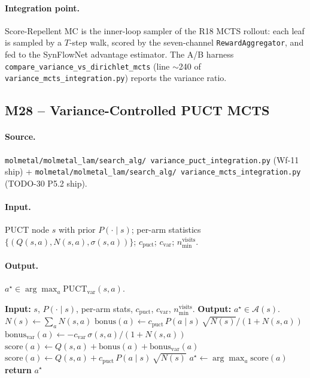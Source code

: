 \paragraph{Integration point.}
Score-Repellent MC is the inner-loop sampler of the R18 MCTS
rollout: each leaf is sampled by a $T$-step walk, scored by the
seven-channel \texttt{RewardAggregator}, and fed to the SynFlowNet
advantage estimator.  The A/B harness
\texttt{compare\_variance\_vs\_dirichlet\_mcts} (line $\sim$240 of
\texttt{variance\_mcts\_integration.py}) reports the variance
ratio.

\subsection*{M28 -- Variance-Controlled PUCT MCTS}
\label{supp:s2-m28}

\paragraph{Source.}
\texttt{molmetal/molmetal\_lam/search\_alg/
variance\_puct\_integration.py} (Wf-11 ship) +
\texttt{molmetal/molmetal\_lam/search\_alg/
variance\_mcts\_integration.py} (TODO-30 P5.2 ship).

\paragraph{Input.}
PUCT node $s$ with prior $P(\cdot \mid s)$; per-arm statistics
$\{(Q(s, a), N(s, a), \sigma(s, a))\}$; $c_{\mathrm{puct}}$;
$c_{\mathrm{var}}$; $n_{\mathrm{min}}^{\mathrm{visits}}$.

\paragraph{Output.}
$a^{\star} \in \arg\max_{a} \mathrm{PUCT}_{\mathrm{var}}(s, a)$.

\begin{algorithmic}[1]
  \STATE \textbf{Input:} $s$, $P(\cdot \mid s)$, per-arm stats,
         $c_{\mathrm{puct}}$, $c_{\mathrm{var}}$, $n_{\mathrm{min}}^{\mathrm{visits}}$.
  \STATE \textbf{Output:} $a^{\star} \in \mathcal{A}(s)$.
  \STATE $N(s) \gets \sum_{a} N(s, a)$
      \STATE $\mathrm{bonus}(a) \gets c_{\mathrm{puct}}\, P(a \mid s)\,
                              \sqrt{N(s)} / (1 + N(s, a))$
      \STATE $\mathrm{bonus}_{\mathrm{var}}(a) \gets
                  -c_{\mathrm{var}}\, \sigma(s, a) / (1 + N(s, a))$
      \STATE $\mathrm{score}(a) \gets Q(s, a) + \mathrm{bonus}(a) +
                                    \mathrm{bonus}_{\mathrm{var}}(a)$
    \ELSE
      \STATE $\mathrm{score}(a) \gets Q(s, a) + c_{\mathrm{puct}}\,
                                    P(a \mid s)\,
                                    \sqrt{N(s)}$
    \ENDIF
  \ENDFOR
  \STATE $a^{\star} \gets \arg\max_{a} \mathrm{score}(a)$
  \STATE \textbf{return} $a^{\star}$
\end{algorithmic}

